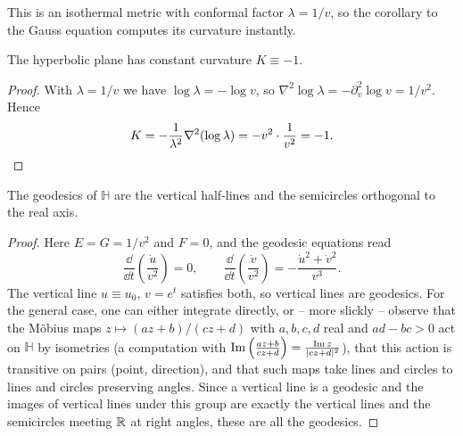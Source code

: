 \documentclass[a4paper]{scrartcl}
\newcommand{\HH}{\mathbb{H}}
\begin{document}
This is an isothermal metric with conformal factor $\lambda = 1/v$, so the corollary to the Gauss equation computes its curvature instantly.

\begin{proposition}
    The hyperbolic plane has constant curvature $K \equiv -1$.
\end{proposition}
\begin{proof}
    With $\lambda = 1/v$ we have $\log\lambda = -\log v$, so $\nabla^2\log\lambda = -\partial_v^2\log v = 1/v^2$. Hence
    $$
    K = -\frac{1}{\lambda^2}\nabla^2(\log\lambda) = -v^2\cdot\frac{1}{v^2} = -1. \qedhere
    $$
\end{proof}

\begin{proposition}
    The geodesics of $\HH$ are the vertical half-lines and the semicircles orthogonal to the real axis.
\end{proposition}
\begin{proof}
    Here $E = G = 1/v^2$ and $F = 0$, and the geodesic equations read
    $$
    \frac{\dd}{\dd t}\left(\frac{\dot u}{v^2}\right) = 0, \qquad \frac{\dd}{\dd t}\left(\frac{\dot v}{v^2}\right) = -\frac{\dot u^2 + \dot v^2}{v^3}.
    $$
    The vertical line $u \equiv u_0$, $v = e^t$ satisfies both, so vertical lines are geodesics. For the general case, one can either integrate directly, or -- more slickly -- observe that the M\"obius maps $z \mapsto (az+b)/(cz+d)$ with $a,b,c,d$ real and $ad-bc>0$ act on $\HH$ by isometries (a computation with $\operatorname{Im}\left(\frac{az+b}{cz+d}\right) = \frac{\operatorname{Im} z}{|cz+d|^2}$), that this action is transitive on pairs (point, direction), and that such maps take lines and circles to lines and circles preserving angles. Since a vertical line is a geodesic and the images of vertical lines under this group are exactly the vertical lines and the semicircles meeting $\mathbb{R}$ at right angles, these are all the geodesics.
\end{proof}

\begin{center}
\end{center}
\end{document}
